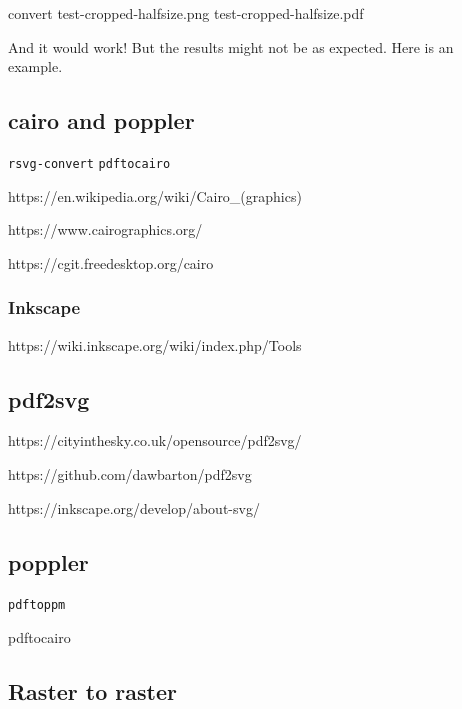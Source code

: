 \documentclass[
  11pt,
  british,
  a4paper,
]{article}
\newenvironment{Shaded}{\begin{snugshade}}{\end{snugshade}}
\newcommand{\ExtensionTok}[1]{\textcolor[rgb]{0.80,0.80,0.80}{#1}}
\newcommand{\NormalTok}[1]{\textcolor[rgb]{0.80,0.80,0.80}{#1}}
\begin{document}
\begin{Shaded}
\begin{Highlighting}[]
\ExtensionTok{convert}\NormalTok{ test{-}cropped{-}halfsize.png test{-}cropped{-}halfsize.pdf}
\end{Highlighting}
\end{Shaded}

And it would work! But the results might not be as expected. Here is an
example.

\hypertarget{cairo-and-poppler}{%
\subsection{cairo and poppler}\label{cairo-and-poppler}}

\texttt{rsvg-convert} \texttt{pdftocairo}

https://en.wikipedia.org/wiki/Cairo\_(graphics)

https://www.cairographics.org/

https://cgit.freedesktop.org/cairo

\hypertarget{inkscape}{%
\subsubsection{Inkscape}\label{inkscape}}

https://wiki.inkscape.org/wiki/index.php/Tools

\hypertarget{pdf2svg}{%
\subsection{pdf2svg}\label{pdf2svg}}

https://cityinthesky.co.uk/opensource/pdf2svg/

https://github.com/dawbarton/pdf2svg

https://inkscape.org/develop/about-svg/

\hypertarget{poppler}{%
\subsection{poppler}\label{poppler}}

\texttt{pdftoppm}

pdftocairo

\hypertarget{raster-to-raster}{%
\subsection{Raster to raster}\label{raster-to-raster}}
\end{document}
